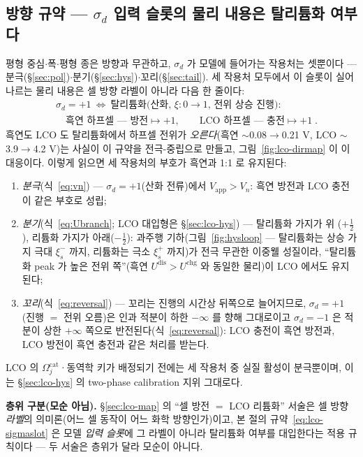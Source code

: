 \documentclass[11pt,a4paper]{article}
\newcommand{\app}{\mathrm{app}}
\newcommand{\dis}{\mathrm{dis}}
\newcommand{\chg}{\mathrm{chg}}
\begin{document}
\subsection{방향 규약 --- $\sigma_d$ 입력 슬롯의 물리 내용은 탈리튬화 여부다}\label{sec:lco-direction}
평형 중심$\cdot$폭$\cdot$평형 종은 방향과 무관하고, $\sigma_d$ 가 모델에 들어가는 작용처는 셋뿐이다 ---
분극(\S\ref{sec:pol})$\cdot$분기(\S\ref{sec:hys})$\cdot$꼬리(\S\ref{sec:tail}). 세 작용처 모두에서 이 슬롯이
실어 나르는 물리 내용은 셀 방향 라벨이 아니라 다음 한 줄이다:
\begin{equation}
\boxed{\;\begin{aligned}
&\sigma_d=+1\ \Leftrightarrow\ \text{탈리튬화(산화, $\xi:0\!\to\!1$, 전위 상승 진행)}:\\
&\quad\text{흑연 하프셀 --- 방전}\mapsto+1,\qquad \text{LCO 하프셀 --- 충전}\mapsto+1\;.
\end{aligned}}
\label{eq:lco-sigmaslot}
\end{equation}
흑연도 LCO 도 탈리튬화에서 하프셀 전위가 \emph{오른다}(흑연 $\sim$0.08$\to$0.21 V, LCO
$\sim$3.9$\to$4.2 V)는 사실이 이 규약을 전극-중립으로 만들고, 그림~\ref{fig:lco-dirmap} 이 이 대응이다.
이렇게 읽으면 세 작용처의 부호가 흑연과 1:1 로 유지된다:
\begin{enumerate}[label=(\alph*),leftmargin=2.2em,itemsep=1pt]
\item \emph{분극}(식~\eqref{eq:vn}) --- $\sigma_d=+1$(산화 전류)에서 $V_\app>V_n$: 흑연 방전과 LCO 충전이
같은 부호로 성립;
\item \emph{분기}(식~\eqref{eq:Ubranch}; LCO 대입형은 \S\ref{sec:lco-hys}) --- 탈리튬화 가지가 위
($+\tfrac12$), 리튬화 가지가 아래($-\tfrac12$): 과주행 기하(그림~\ref{fig:hysloop} --- 탈리튬화는 상승
가지 극대 $\xi_s^-$ 까지, 리튬화는 극소 $\xi_s^+$ 까지)가 전극 무관한 이중웰 성질이라, ``탈리튬화 peak 가
높은 전위 쪽''(흑연 $U^{\dis}>U^{\chg}$ 와 동일한 물리)이 LCO 에서도 유지된다;
\item \emph{꼬리}(식~\eqref{eq:reversal}) --- 꼬리는 진행의 시간상 뒤쪽으로 늘어지므로, $\sigma_d=+1$
(진행 $=$ 전위 오름)은 인과 적분이 하한 $-\infty$ 를 향해 그대로이고 $\sigma_d=-1$ 은 적분이 상한 $+\infty$ 쪽으로
반전된다(식~\eqref{eq:reversal}): LCO 충전이 흑연 방전과, LCO 방전이 흑연 충전과 같은 처리를 받는다.
\end{enumerate}
LCO 의 $\Omega_j^\mathrm{cat}$·동역학 키가 배정되기 전에는 세 작용처 중 실질 활성이 분극뿐이며, 이는
\S\ref{sec:lco-hys} 의 two-phase calibration 지위 그대로다.

\textbf{층위 구분(모순 아님).} \S\ref{sec:lco-map} 의 ``셀 방전 $=$ LCO 리튬화'' 서술은 셀 방향
\emph{라벨}의 의미론(어느 셀 동작이 어느 화학 방향인가)이고, 본 절의 규약~\eqref{eq:lco-sigmaslot} 은 모델
\emph{입력 슬롯}에 그 라벨이 아니라 탈리튬화 여부를 대입한다는 적용 규칙이다 --- 두 서술은 층위가 달라 모순이
아니다.
\end{document}
